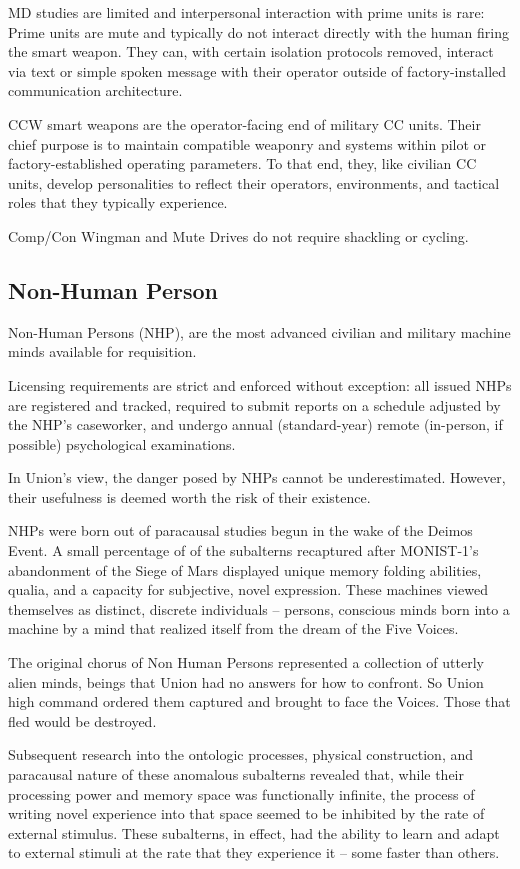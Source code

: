 MD studies are limited and interpersonal interaction with prime units is rare: Prime units are mute
and typically do not interact directly with the human firing the smart weapon. They can, with
certain isolation protocols removed, interact via text or simple spoken message with their
operator outside of factory-installed communication architecture.

CCW smart weapons are the operator-facing end of military CC units. Their chief purpose is to
maintain compatible weaponry and systems within pilot or factory-established operating
parameters. To that end, they, like civilian CC units, develop personalities to reflect their
operators, environments, and tactical roles that they typically experience.

Comp/Con Wingman and Mute Drives do not require shackling or cycling.

\subsection{Non-Human Person}

Non-Human Persons (NHP), are the most advanced civilian and military machine minds available
for requisition.

Licensing requirements are strict and enforced without exception: all issued NHPs are registered
and tracked, required to submit reports on a schedule adjusted by the NHP’s caseworker, and
undergo annual (standard-year) remote (in-person, if possible) psychological examinations.

In Union’s view, the danger posed by NHPs cannot be underestimated. However, their usefulness
is deemed worth the risk of their existence.

NHPs were born out of paracausal studies begun in the wake of the Deimos Event. A small
percentage of of the subalterns recaptured after MONIST-1’s abandonment of the Siege of Mars
displayed unique memory folding abilities, qualia, and a capacity for subjective, novel
expression. These machines viewed themselves as distinct, discrete individuals -- persons,
conscious minds born into a machine by a mind that realized itself from the dream of the Five
Voices.

The original chorus of Non Human Persons represented a collection of utterly alien minds, beings
that Union had no answers for how to confront. So Union high command ordered them captured
and brought to face the Voices. Those that fled would be destroyed.

Subsequent research into the ontologic processes, physical construction, and paracausal nature
of these anomalous subalterns revealed that, while their processing power and memory space
was functionally infinite, the process of writing novel experience into that space seemed to be
inhibited by the rate of external stimulus. These subalterns, in effect, had the ability to learn and
adapt to external stimuli at the rate that they experience it -- some faster than others.

